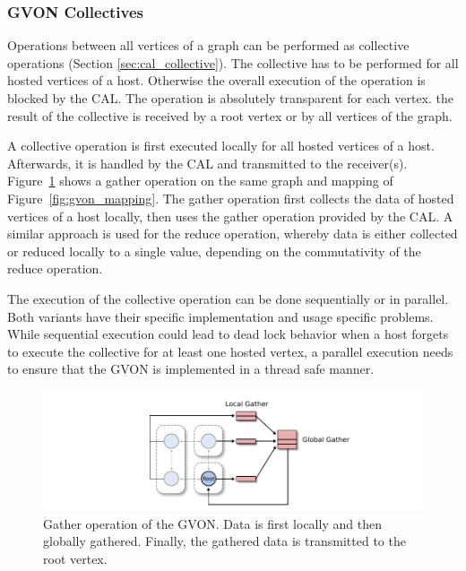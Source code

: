 \subsubsection*{GVON Collectives}
\label{sec:design:gvon_collectives}
Operations between all vertices of a graph can be performed as
collective operations (Section \ref{sec:cal_collective}).  The
collective has to be performed for all hosted vertices of a
host. Otherwise the overall execution of the operation is blocked by
the CAL. The operation is absolutely transparent for each vertex.  the
result of the collective is received by a root vertex or by all
vertices of the graph.

A collective operation is first executed locally for all hosted
vertices of a host. Afterwards, it is handled by the CAL and
transmitted to the receiver(s). Figure~\ref{fig:gvon_collective} shows
a gather operation on the same graph and mapping of
Figure~\ref{fig:gvon_mapping}.  The gather operation first collects
the data of hosted vertices of a host locally, then uses the gather
operation provided by the CAL.  A similar approach is used for the
reduce operation, whereby data is either collected or reduced locally
to a single value, depending on the commutativity of the reduce
operation.

The execution of the collective operation can be done sequentially or in
parallel. Both variants have their specific implementation and usage
specific problems. While sequential execution could lead to dead lock behavior
when a host forgets to execute the collective for at least one hosted vertex,
a parallel execution needs to ensure that the GVON is implemented in
a thread safe manner.

\begin{figure}[H]
  \centering \includegraphics[width=\textwidth]{graphics/30_gvon_collective}
  \caption{Gather operation of the GVON. Data is first locally and
    then globally gathered. Finally, the gathered data is transmitted
    to the root vertex.}
  \label{fig:gvon_collective}
\end{figure}


